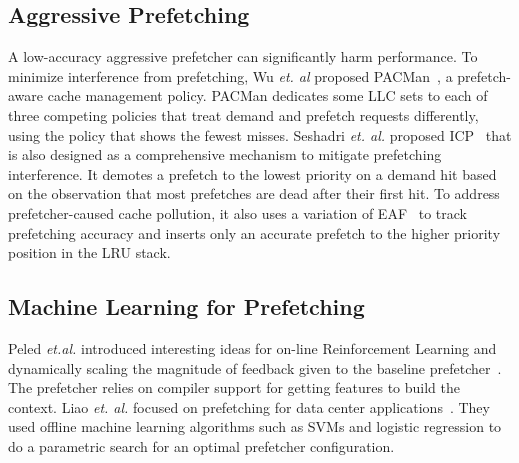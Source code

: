 
\subsection{Aggressive Prefetching}


A low-accuracy aggressive prefetcher can significantly harm performance.  To
minimize interference from prefetching, Wu \textit{et. al} proposed
PACMan~\cite{pacman}, a prefetch-aware cache management policy.  PACMan
dedicates some LLC sets to each of three competing policies that treat demand
and prefetch requests differently, using the policy that shows the fewest
misses. Seshadri \textit{et. al.} proposed ICP~\cite{icp} that is also
designed as a comprehensive mechanism to mitigate prefetching interference. It
demotes a prefetch to the lowest priority on a demand hit based on the
observation that most prefetches are dead after their first hit.  To address
prefetcher-caused cache pollution, it also uses a variation of EAF~\cite{eaf}
to track prefetching accuracy and inserts only an accurate prefetch to the
higher priority position in the LRU stack.

\subsection{Machine Learning for Prefetching}
Peled \textit{et.al.} introduced interesting ideas for on-line Reinforcement
Learning and dynamically scaling the magnitude of feedback given to the
baseline prefetcher~\cite{Semantics}.  The prefetcher relies on compiler
support for getting features to build the context.  Liao \textit{et. al.}
focused on prefetching for data center applications~\cite{Datacenter}. They
used offline machine learning algorithms such as SVMs and logistic regression
to do a parametric search for an optimal prefetcher configuration.
